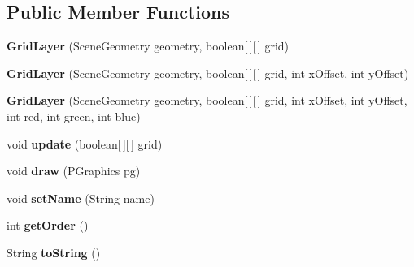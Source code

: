 \subsection*{Public Member Functions}
\begin{DoxyCompactItemize}
\item 
\hypertarget{classdev_1_1boxy_1_1fortyfive_1_1_grid_layer_ab1b5319efc992eb874f6574ec7cec2eb}{
{\bfseries GridLayer} (SceneGeometry geometry, boolean\mbox{[}$\,$\mbox{]}\mbox{[}$\,$\mbox{]} grid)}
\label{d4/d48/classdev_1_1boxy_1_1fortyfive_1_1_grid_layer_ab1b5319efc992eb874f6574ec7cec2eb}

\item 
\hypertarget{classdev_1_1boxy_1_1fortyfive_1_1_grid_layer_ad2910313bd93ff57a49b73789bdf29cc}{
{\bfseries GridLayer} (SceneGeometry geometry, boolean\mbox{[}$\,$\mbox{]}\mbox{[}$\,$\mbox{]} grid, int xOffset, int yOffset)}
\label{d4/d48/classdev_1_1boxy_1_1fortyfive_1_1_grid_layer_ad2910313bd93ff57a49b73789bdf29cc}

\item 
\hypertarget{classdev_1_1boxy_1_1fortyfive_1_1_grid_layer_a327d89077215bab601b41ebc4d609993}{
{\bfseries GridLayer} (SceneGeometry geometry, boolean\mbox{[}$\,$\mbox{]}\mbox{[}$\,$\mbox{]} grid, int xOffset, int yOffset, int red, int green, int blue)}
\label{d4/d48/classdev_1_1boxy_1_1fortyfive_1_1_grid_layer_a327d89077215bab601b41ebc4d609993}

\item 
\hypertarget{classdev_1_1boxy_1_1fortyfive_1_1_grid_layer_ad8b71fe6fd55ea3d7e8453e71413c28b}{
void {\bfseries update} (boolean\mbox{[}$\,$\mbox{]}\mbox{[}$\,$\mbox{]} grid)}
\label{d4/d48/classdev_1_1boxy_1_1fortyfive_1_1_grid_layer_ad8b71fe6fd55ea3d7e8453e71413c28b}

\item 
\hypertarget{classdev_1_1boxy_1_1fortyfive_1_1_grid_layer_af2e093c3888121b46fff135c6389089b}{
void {\bfseries draw} (PGraphics pg)}
\label{d4/d48/classdev_1_1boxy_1_1fortyfive_1_1_grid_layer_af2e093c3888121b46fff135c6389089b}

\item 
\hypertarget{classdev_1_1boxy_1_1fortyfive_1_1_grid_layer_adb63f3edfba837d6972af37e04e9059f}{
void {\bfseries setName} (String name)}
\label{d4/d48/classdev_1_1boxy_1_1fortyfive_1_1_grid_layer_adb63f3edfba837d6972af37e04e9059f}

\item 
\hypertarget{classdev_1_1boxy_1_1fortyfive_1_1_grid_layer_a4a0de2a0a7e449a7844d03a5070ad358}{
int {\bfseries getOrder} ()}
\label{d4/d48/classdev_1_1boxy_1_1fortyfive_1_1_grid_layer_a4a0de2a0a7e449a7844d03a5070ad358}

\item 
\hypertarget{classdev_1_1boxy_1_1fortyfive_1_1_grid_layer_adfecc00a1aadc8c6576011a7be2dff29}{
String {\bfseries toString} ()}
\label{d4/d48/classdev_1_1boxy_1_1fortyfive_1_1_grid_layer_adfecc00a1aadc8c6576011a7be2dff29}

\end{DoxyCompactItemize}
